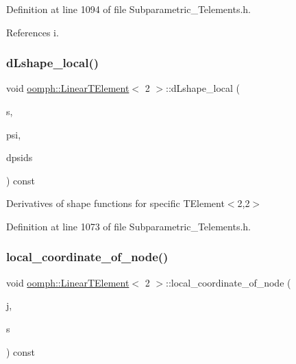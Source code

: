 Definition at line 1094 of file Subparametric\+\_\+\+Telements.\+h.



References i.

\mbox{\label{classoomph_1_1LinearTElement_3_012_01_4_a25953f47a9f66aaa947cba3c667f0ef2}} 
\subsubsection{\texorpdfstring{d\+Lshape\+\_\+local()}{dLshape\_local()}}
{\footnotesize\ttfamily void \hyperlink{classoomph_1_1LinearTElement}{oomph\+::\+Linear\+T\+Element}$<$ 2 $>$\+::d\+Lshape\+\_\+local (\begin{DoxyParamCaption}\item[{const \hyperlink{classoomph_1_1Vector}{Vector}$<$ double $>$ \&}]{s,  }\item[{\hyperlink{classoomph_1_1Shape}{Shape} \&}]{psi,  }\item[{\hyperlink{classoomph_1_1DShape}{D\+Shape} \&}]{dpsids }\end{DoxyParamCaption}) const\hspace{0.3cm}{\ttfamily [inline]}}



Derivatives of shape functions for specific T\+Element$<$2,2$>$ 



Definition at line 1073 of file Subparametric\+\_\+\+Telements.\+h.

\mbox{\label{classoomph_1_1LinearTElement_3_012_01_4_a0f45d00770d1c86cb2eb65d747b5cba3}} 
\subsubsection{\texorpdfstring{local\+\_\+coordinate\+\_\+of\+\_\+node()}{local\_coordinate\_of\_node()}}
{\footnotesize\ttfamily void \hyperlink{classoomph_1_1LinearTElement}{oomph\+::\+Linear\+T\+Element}$<$ 2 $>$\+::local\+\_\+coordinate\+\_\+of\+\_\+node (\begin{DoxyParamCaption}\item[{const unsigned \&}]{j,  }\item[{\hyperlink{classoomph_1_1Vector}{Vector}$<$ double $>$ \&}]{s }\end{DoxyParamCaption}) const\hspace{0.3cm}{\ttfamily [inline]}}



